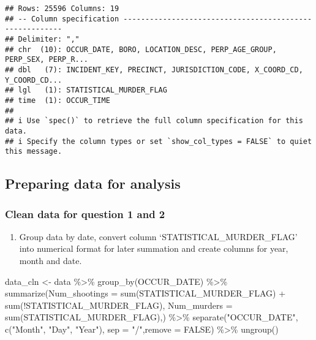 \documentclass[
]{article}
\newenvironment{Shaded}{\begin{snugshade}}{\end{snugshade}}
\newcommand{\AttributeTok}[1]{\textcolor[rgb]{0.77,0.63,0.00}{#1}}
\newcommand{\ConstantTok}[1]{\textcolor[rgb]{0.00,0.00,0.00}{#1}}
\newcommand{\FunctionTok}[1]{\textcolor[rgb]{0.00,0.00,0.00}{#1}}
\newcommand{\NormalTok}[1]{#1}
\newcommand{\OtherTok}[1]{\textcolor[rgb]{0.56,0.35,0.01}{#1}}
\newcommand{\SpecialCharTok}[1]{\textcolor[rgb]{0.00,0.00,0.00}{#1}}
\newcommand{\StringTok}[1]{\textcolor[rgb]{0.31,0.60,0.02}{#1}}
\providecommand{\tightlist}{%
  \setlength{\itemsep}{0pt}\setlength{\parskip}{0pt}}
\begin{document}
\begin{verbatim}
## Rows: 25596 Columns: 19
## -- Column specification --------------------------------------------------------
## Delimiter: ","
## chr  (10): OCCUR_DATE, BORO, LOCATION_DESC, PERP_AGE_GROUP, PERP_SEX, PERP_R...
## dbl   (7): INCIDENT_KEY, PRECINCT, JURISDICTION_CODE, X_COORD_CD, Y_COORD_CD...
## lgl   (1): STATISTICAL_MURDER_FLAG
## time  (1): OCCUR_TIME
## 
## i Use `spec()` to retrieve the full column specification for this data.
## i Specify the column types or set `show_col_types = FALSE` to quiet this message.
\end{verbatim}

\hypertarget{preparing-data-for-analysis}{%
\subsection{Preparing data for
analysis}\label{preparing-data-for-analysis}}

\hypertarget{clean-data-for-question-1-and-2}{%
\subsubsection{Clean data for question 1 and
2}\label{clean-data-for-question-1-and-2}}

\begin{enumerate}
\def\labelenumi{\arabic{enumi})}
\tightlist
\item
  Group data by date, convert column `STATISTICAL\_MURDER\_FLAG' into
  numerical format for later summation and create columns for year,
  month and date.
\end{enumerate}

\begin{Shaded}
\begin{Highlighting}[]
\NormalTok{data\_cln }\OtherTok{\textless{}{-}}\NormalTok{ data }\SpecialCharTok{\%\textgreater{}\%} \FunctionTok{group\_by}\NormalTok{(OCCUR\_DATE) }\SpecialCharTok{\%\textgreater{}\%} \FunctionTok{summarize}\NormalTok{(}\AttributeTok{Num\_shootings =} \FunctionTok{sum}\NormalTok{(STATISTICAL\_MURDER\_FLAG) }\SpecialCharTok{+} \FunctionTok{sum}\NormalTok{(}\SpecialCharTok{!}\NormalTok{STATISTICAL\_MURDER\_FLAG), }\AttributeTok{Num\_murders =} \FunctionTok{sum}\NormalTok{(STATISTICAL\_MURDER\_FLAG),) }\SpecialCharTok{\%\textgreater{}\%} \FunctionTok{separate}\NormalTok{(}\StringTok{"OCCUR\_DATE"}\NormalTok{, }\FunctionTok{c}\NormalTok{(}\StringTok{"Month"}\NormalTok{, }\StringTok{"Day"}\NormalTok{, }\StringTok{"Year"}\NormalTok{), }\AttributeTok{sep =} \StringTok{"/"}\NormalTok{,}\AttributeTok{remove =} \ConstantTok{FALSE}\NormalTok{) }\SpecialCharTok{\%\textgreater{}\%} \FunctionTok{ungroup}\NormalTok{()}
\end{Highlighting}
\end{Shaded}
\end{document}
